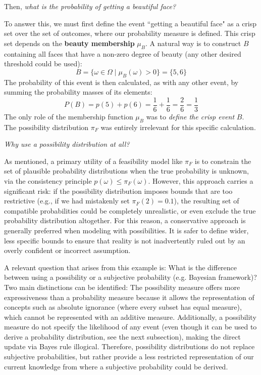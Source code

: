 \begin{example}
    Then, \textit{what is the probability of getting a beautiful face?}
    
    To answer this, we must first define the event ``getting a beautiful face" as a crisp set over the set of outcomes, where our probability measure is defined. This crisp set depends on the \textbf{beauty membership} $\mu_B$. A natural way is to construct $B$ containing all faces that have a non-zero degree of beauty (any other desired threshold could be used):
    \[ B = \{\omega \in \Omega \mid \mu_B(\omega) > 0\} = \{5, 6\} \]
    The probability of this event is then calculated, as with any other event, by summing the probability masses of its elements:
    \[ P(B) = p(5) + p(6) = \frac{1}{6} + \frac{1}{6} = \frac{2}{6} = \frac{1}{3} \]
    The only role of the membership function $\mu_B$ was to \textit{define the crisp event} $B$. The possibility distribution $\pi_F$ was entirely irrelevant for this specific calculation.
    
    \textit{Why use a possibility distribution at all?}

    As mentioned, a primary utility of a feasibility model like $\pi_F$ is to constrain the set of plausible probability distributions when the true probability is unknown, via the consistency principle $p(\omega) \leq \pi_F(\omega)$. However, this approach carries a significant risk: if the possibility distribution imposes bounds that are too restrictive (e.g., if we had mistakenly set $\pi_F(2)=0.1$), the resulting set of compatible probabilities could be completely unrealistic, or even exclude the true probability distribution altogether. For this reason, a conservative approach is generally preferred when modeling with possibilities. It is safer to define wider, less specific bounds to ensure that reality is not inadvertently ruled out by an overly confident or incorrect assumption.
\end{example}

A relevant question that arises from this example is: What is the difference between using a possibility or a subjective probability (e.g. Bayesian framework)? Two main distinctions can be identified: The possibility measure offers more expressiveness than a probability measure because it allows the representation of concepts such as absolute ignorance (where every subset has equal measure), which cannot be represented with an additive measure\cite{Dubois1997}. Additionally, a possibility measure do not specify the likelihood of any event (even though it can be used to derive a probability distribution, see the next subsection), making the direct update via Bayes rule illogical. Therefore, possibility distributions do not replace subjective probabilities, but rather provide a less restricted representation of our current knowledge from where a subjective probability could be derived.\\

